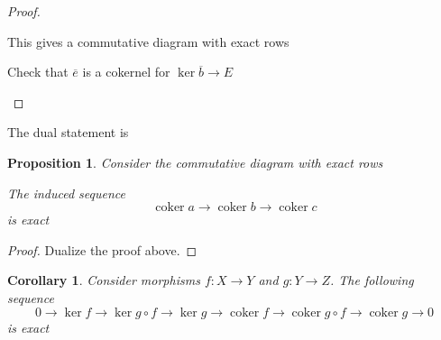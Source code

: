 \documentclass[5pt]{article}
\newtheorem{proposition}[theorem]{Proposition}
\newtheorem{corollary}[theorem]{Corollary}
\theoremstyle{definition}
\theoremstyle{remark}
\renewcommand{\bar}[1]{\overline{#1}}
\DeclareMathOperator{\coker}{coker}
\DeclareMathOperator{\Img}{Im}
\begin{document}
\begin{proof}
\begin{proofenum}
\begin{enumerate}
						This gives a commutative diagram with exact rows
						\begin{center}
						\end{center}
						Check that $\bar{e}$ is a cokernel for $\ker \bar{b} \rightarrow E$
				\end{enumerate}
		\end{proofenum}
	\end{proof}		
	The dual statement is
	\begin{proposition}
		Consider the commutative diagram with exact rows
		\begin{center}
		\end{center}
		The induced sequence 
		\begin{equation}
			\coker a \rightarrow \coker b \rightarrow \coker c
		\end{equation}
		is exact
	\end{proposition}
	\begin{proof}
		Dualize the proof above.
	\end{proof}
	
	\begin{corollary}
		Consider morphisms $f: X \rightarrow Y$ and $g: Y \rightarrow Z$. The following sequence
		\begin{equation}
			0 \rightarrow \ker f \rightarrow \ker g \circ f \rightarrow \ker g \rightarrow \coker f \rightarrow \coker g \circ f \rightarrow \coker g \rightarrow 0
		\end{equation}
		is exact
	\end{corollary}	
	
\end{document}
